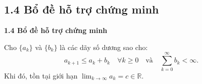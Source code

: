 \subsection{1.4 Bổ đề hỗ trợ chứng minh}

\begin{frame}[t]{\textbf{\large 1.4 Bổ đề hỗ trợ chứng minh}}
    \vspace*{-1cm}
    \begin{lemma}[Xu 2002]
        Cho $\{a_k\}$ và $\{b_k\}$ là các dãy số dương sao cho:
        \[
            a_{k+1} \le a_k + b_k \quad \forall k \ge 0 \quad \text{và} \quad \sum_{k=0}^\infty b_k < \infty.
        \]
        Khi đó, tồn tại giới hạn $\lim_{k \to \infty} a_k = c \in \mathbb{R}$.
    \end{lemma}
\end{frame}